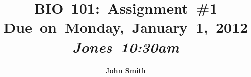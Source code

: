 \documentclass{article}
\begin{document}

\newcommand{\hmwkTitle}{Assignment\ \#1} %
\newcommand{\hmwkDueDate}{Monday,\ January\ 1,\ 2012} %
\newcommand{\hmwkClass}{BIO\ 101} %
\newcommand{\hmwkClassTime}{10:30am} %
\newcommand{\hmwkClassInstructor}{Jones} %
\newcommand{\hmwkAuthorName}{John Smith} %


\title{
\vspace{2in}
\textmd{\textbf{\hmwkClass:\ \hmwkTitle}}\\
\normalsize\vspace{0.1in}\small{Due\ on\ \hmwkDueDate}\\
\vspace{0.1in}\large{\textit{\hmwkClassInstructor\ \hmwkClassTime}}
\vspace{3in}
}

\author{\textbf{\hmwkAuthorName}}
\date{} %

\end{document}
